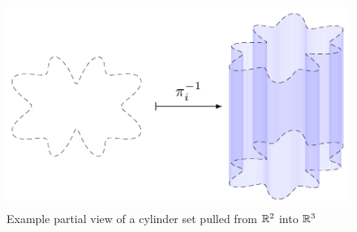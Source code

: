 \documentclass{fkpaper}
\begin{document}
\begin{multicols}{2}
\begin{figure}[H]
  \centering
  \includegraphics{figures/cylinder-set-pullback-example.pdf}
  \caption{Example partial view of a cylinder set pulled from $\mathbb{R}^2$
    into $\mathbb{R}^3$}
  \label{fig:cylinder-set}
\end{figure}


\end{multicols}
\end{document}
